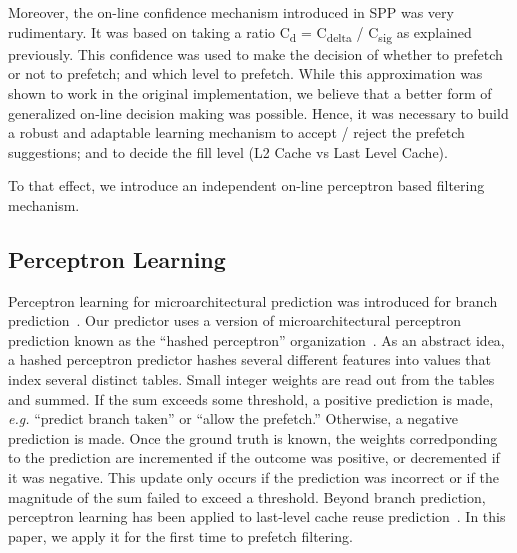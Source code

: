 Moreover, the on-line confidence mechanism introduced in SPP was very
rudimentary.  It was based on taking a ratio C\textsubscript{d} =
C\textsubscript{delta} / C\textsubscript{sig} as explained previously. This
confidence was used to make the decision of whether to prefetch or not to
prefetch; and which level to prefetch.  While this approximation was shown to
work in the original implementation, we believe that a better form of
generalized on-line decision making was possible.  Hence, it was necessary to
build a robust and adaptable learning mechanism to accept / reject the
prefetch suggestions; and to decide the fill level (L2 Cache vs Last Level
Cache).

To that effect, we introduce an independent on-line perceptron based
filtering mechanism.

\subsection{Perceptron Learning}
\label{sec:Background-Perceptron}
Perceptron learning for microarchitectural prediction was introduced for
branch prediction~\cite{PerceptronPredictor}. Our predictor uses a version of
microarchitectural perceptron prediction known as the ``hashed perceptron''
organization~\cite{HashedPerceptron}. As an abstract idea, a hashed perceptron
predictor hashes several different features into values that index several
distinct tables. Small integer weights are read out from the tables and
summed. If the sum exceeds some threshold, a positive prediction is made, {\em
e.g.} ``predict branch taken'' or ``allow the prefetch.'' Otherwise, a
negative prediction is made. Once the ground truth is known, the weights
corredponding to the prediction are incremented if the outcome was positive,
or decremented if it was negative. This update only occurs if the prediction
was incorrect or if the magnitude of the sum failed to exceed a threshold.
Beyond branch prediction, perceptron learning has been applied to last-level
cache reuse prediction~\cite{Perc_Reuse,Multiperspective}. In this paper, we
apply it for the first time to prefetch filtering.

